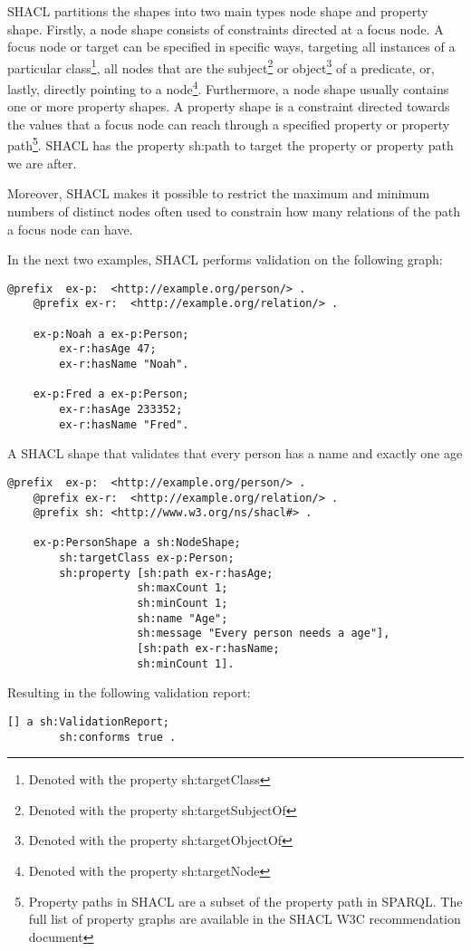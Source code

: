\para 
SHACL partitions the shapes into two main types node shape and property shape. Firstly, a node shape consists of constraints directed at a focus node.  A focus node or target can be specified in specific ways, targeting all instances of a particular class\footnote{Denoted with the property sh:targetClass}, all nodes that are the subject\footnote{Denoted with the property sh:targetSubjectOf} or object\footnote{Denoted with the property sh:targetObjectOf} of a predicate, or, lastly, directly pointing to a node\footnote{Denoted with the property sh:targetNode}. Furthermore, a node shape usually contains one or more property shapes. A property shape is a constraint directed towards the values that a focus node can reach through a specified property or property path\footnote{Property paths in SHACL are a subset of the property path in SPARQL. The full list of property graphs are available in the SHACL W3C recommendation document\autocite{SHACL}}.  SHACL has the property sh:path to target the property or property path we are after.  

\para
Moreover, SHACL makes it possible to restrict the maximum and minimum numbers of distinct nodes often used to constrain how many relations of the path a focus node can have. 

\para
In the next two examples, SHACL performs validation on the following graph:
\begin{lstlisting}[frame=single, language=turtle, frame=none]
    @prefix  ex-p:  <http://example.org/person/> . 
    @prefix ex-r:  <http://example.org/relation/> . 

    ex-p:Noah a ex-p:Person;
        ex-r:hasAge 47;
        ex-r:hasName "Noah".

    ex-p:Fred a ex-p:Person;
        ex-r:hasAge 233352;
        ex-r:hasName "Fred".
\end{lstlisting}

\begin{example}
A SHACL shape that validates that every person has a name and exactly one age
\end{example}

\begin{lstlisting}[frame=single, language=turtle, frame=none]
    @prefix  ex-p:  <http://example.org/person/> . 
    @prefix ex-r:  <http://example.org/relation/> . 
    @prefix sh:	<http://www.w3.org/ns/shacl#> .

    ex-p:PersonShape a sh:NodeShape;
        sh:targetClass ex-p:Person;
        sh:property [sh:path ex-r:hasAge; 
                    sh:maxCount 1;
                    sh:minCount 1;
                    sh:name "Age";
                    sh:message "Every person needs a age"],
                    [sh:path ex-r:hasName;
                    sh:minCount 1].
\end{lstlisting}
Resulting in the following validation report:
\begin{lstlisting}[frame=single, language=turtle, frame=none]
    [] a sh:ValidationReport;
        sh:conforms true .
\end{lstlisting}

